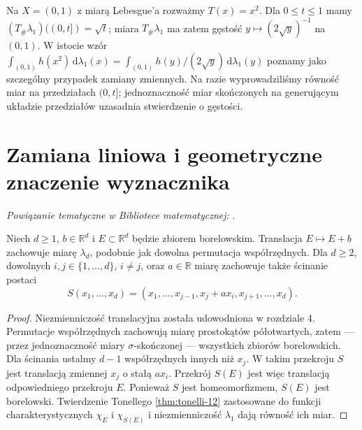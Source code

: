 \begin{przyklad}
Na $X=(0,1)$ z miarą Lebesgue'a rozważmy $T(x)=x^2$.
Dla $0\le t\le1$ mamy
$(T_\#\lambda_1)((0,t])=\sqrt t$; miara $T_\#\lambda_1$
ma zatem gęstość $y\mapsto(2\sqrt y)^{-1}$ na $(0,1)$.
W istocie wzór
$\int_{(0,1)}h(x^2)\,\mathrm d\lambda_1(x)
=\int_{(0,1)}h(y)/(2\sqrt y)\,\mathrm d\lambda_1(y)$
poznamy jako szczególny przypadek zamiany zmiennych.
Na razie wyprowadziliśmy równość miar na przedziałach $(0,t]$;
jednoznaczność miar skończonych na generującym układzie przedziałów
uzasadnia stwierdzenie o gęstości.
\end{przyklad}

\section{Zamiana liniowa i geometryczne znaczenie wyznacznika}

\noindent\emph{Powiązanie tematyczne w Bibliotece matematycznej:} .


\begin{lemat}
\label{lem:shear-13}
Niech $d\ge1$, $b\in\mathbb R^d$ i $E\subset\mathbb R^d$
będzie zbiorem borelowskim. Translacja $E\mapsto E+b$ zachowuje
miarę $\lambda_d$, podobnie jak dowolna permutacja współrzędnych.
Dla $d\ge2$, dowolnych
$i,j\in\{1,\ldots,d\}$, $i\ne j$, oraz $a\in\mathbb R$
miarę zachowuje także ścinanie postaci
\[
S(x_1,\ldots,x_d)=(x_1,\ldots,x_{j-1},
 x_j+a x_i,x_{j+1},\ldots,x_d).
\]
\end{lemat}
\begin{proof}
Niezmienniczość translacyjna została udowodniona w rozdziale 4.
Permutacje współrzędnych zachowują miarę prostokątów
półotwartych, zatem — przez jednoznaczność miary
$\sigma$-skończonej — wszystkich zbiorów borelowskich.
Dla ścinania ustalmy $d-1$ współrzędnych innych niż $x_j$.
W takim przekroju $S$ jest translacją zmiennej $x_j$
o stałą $a x_i$. Przekrój $S(E)$ jest więc translacją
odpowiedniego przekroju $E$. Ponieważ $S$ jest homeomorfizmem,
$S(E)$ jest borelowski. Twierdzenie Tonellego
\ref{thm:tonelli-12} zastosowane do funkcji charakterystycznych $\chi_E$ i $\chi_{S(E)}$
i niezmienniczość $\lambda_1$ dają równość ich miar.
\end{proof}

